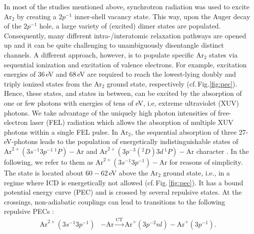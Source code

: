 \documentclass[%
 aip,
rsi,%
 amsmath,amssymb,
preprint,%
]{revtex4-1}
\begin{document}
In most of the studies mentioned above, synchrotron radiation was used to excite Ar$_2$ by creating a $2p^{-1}$ inner-shell vacancy state. This way, upon the Auger decay of the $2p^{-1}$ hole, a large variety of (excited) dimer states are populated. Consequently, many different intra-/interatomic relaxation pathways are opened up and it can be quite challenging to unambiguously disentangle distinct channels. 
A different approach, however, is to populate specific Ar$_2$ states via sequential ionization and excitation of valence electrons. For example, excitation energies of 36\,eV and 68\,eV are required to reach the lowest-lying doubly and triply ionized states from the Ar$_2$ ground state, respectively (cf.\,Fig.\ref{fig:pec}). Hence, these states, and states in between, can be excited by the absorption of one or few photons with energies of tens of eV, i.e, extreme ultraviolet (XUV) photons.
We take advantage of the uniquely high photon intensities of free-electron laser (FEL) \cite{ackermann2007} radiation which allows the absorption of multiple XUV photons within a single FEL pulse. 
In Ar$_2$, the sequential absorption of three 27-eV-photons leads to the population of energetically indistinguishable states of $\mathrm{Ar}^{2+}(3s^{-1}3p^{-1} \, ^{1}P) -\mathrm{Ar}$ and $\mathrm{Ar}^{2+}(3p^{-3}(^{2}D)3d \, ^{1}P) -\mathrm{Ar}$ character \cite{Stoychev2008}. In the following, we refer to them as $\mathrm{Ar}^{2+}(3s^{-1} 3p^{-1}) - \mathrm{Ar}$ for reasons of simplicity. The state is located about $60 - 62$\,eV above the Ar$_2$ ground state, i.e., in a regime where ICD is energetically not allowed (cf.\,Fig.\,\ref{fig:pec}). It has a bound potential energy curve (PEC) and is crossed by several repulsive states. At the crossings, non-adiabatic couplings can lead to transitions to the following repulsive PECs \cite{Stoychev2008}:
%
	\begin{align}
	\mathrm{Ar}^{2+}(3s^{-1} 3p^{-1}) &- \mathrm{Ar} \xrightarrow[]{\text{CT}} \mathrm{Ar}^{+}(3p^{-2}nl) - \mathrm{Ar}^{+}(3p^{-1}).         
	 \label{eq:ct} 
	\end{align}	
\end{document}

